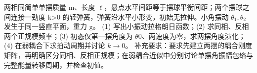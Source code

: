 两相同简单单摆质量 m、长度 \(\ell \)，悬点水平间距等于摆球平衡间距；两个摆球之间连接一劲度 k>0 的轻弹簧，弹簧沿水平小形变，初始无拉伸。小角摆动 \(\theta_1,\theta_2\) 发生于同一竖直平面，重力 g。
(1) 写出小振动拉格朗日函数；(2) 求同相、反相两个正规模频率；(3) 初态仅第一摆角度为 \(\theta 0\)、两速度为零，求两摆角度演化；(4) 在弱耦合下求拍动周期并讨论 \(k\to 0\)。
补充要求：要求先建立两摆的耦合刚度矩阵，再明确区分同相、反相正规模；在弱耦合近似中分别讨论单摆角振幅包络与完整能量转移周期，并检查初值。
